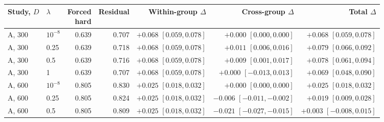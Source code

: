 \begin{tabular}{llrrrrr}
\toprule
Study, $D$ & $\lambda$ & \shortstack{Forced\\hard} & Residual & \shortstack{Within-group\\$\Delta$} & \shortstack{Cross-group\\$\Delta$} & \shortstack{Total\\$\Delta$} \\
\midrule
A, 300 & $10^{-8}$ & 0.639 & 0.707 & \shortstack[r]{$+0.068$\\$[0.059,0.078]$} & \shortstack[r]{$+0.000$\\$[0.000,0.000]$} & \shortstack[r]{$+0.068$\\$[0.059,0.078]$} \\
A, 300 & 0.25 & 0.639 & 0.718 & \shortstack[r]{$+0.068$\\$[0.059,0.078]$} & \shortstack[r]{$+0.011$\\$[0.006,0.016]$} & \shortstack[r]{$+0.079$\\$[0.066,0.092]$} \\
A, 300 & 0.5 & 0.639 & 0.716 & \shortstack[r]{$+0.068$\\$[0.059,0.078]$} & \shortstack[r]{$+0.009$\\$[0.001,0.017]$} & \shortstack[r]{$+0.078$\\$[0.061,0.094]$} \\
A, 300 & 1 & 0.639 & 0.707 & \shortstack[r]{$+0.068$\\$[0.059,0.078]$} & \shortstack[r]{$+0.000$\\$[-0.013,0.013]$} & \shortstack[r]{$+0.069$\\$[0.048,0.090]$} \\
A, 600 & $10^{-8}$ & 0.805 & 0.830 & \shortstack[r]{$+0.025$\\$[0.018,0.032]$} & \shortstack[r]{$+0.000$\\$[0.000,0.000]$} & \shortstack[r]{$+0.025$\\$[0.018,0.032]$} \\
A, 600 & 0.25 & 0.805 & 0.824 & \shortstack[r]{$+0.025$\\$[0.018,0.032]$} & \shortstack[r]{$-0.006$\\$[-0.011,-0.002]$} & \shortstack[r]{$+0.019$\\$[0.009,0.028]$} \\
A, 600 & 0.5 & 0.805 & 0.809 & \shortstack[r]{$+0.025$\\$[0.018,0.032]$} & \shortstack[r]{$-0.021$\\$[-0.027,-0.015]$} & \shortstack[r]{$+0.003$\\$[-0.008,0.015]$} \\

\end{tabular}

